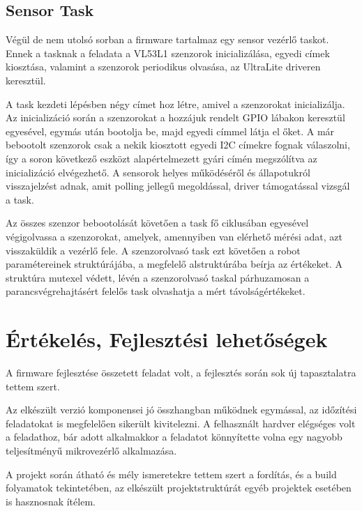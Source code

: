 \subsection{Sensor Task}

Végül de nem utolsó sorban a firmware tartalmaz egy sensor vezérlő taskot. Ennek
a tasknak a feladata a VL53L1 szenzorok inicializálása, egyedi címek kiosztása,
valamint a szenzorok periodikus olvasása, az UltraLite driveren keresztül.

\medskip

A task kezdeti lépésben négy címet hoz létre, amivel a szenzorokat
inicializálja. Az inicializáció során a szenzorokat a hozzájuk rendelt GPIO
lábakon keresztül egyesével, egymás után bootolja be, majd egyedi címmel látja el
őket. A már bebootolt szenzorok csak a nekik kiosztott egyedi I2C címekre fognak
válaszolni, így a soron következő eszközt alapértelmezett gyári címén megszólítva
az inicializáció elvégezhető. A sensorok helyes működéséről és állapotukról
visszajelzést adnak, amit polling jellegű megoldással, driver támogatással
vizsgál a task.

Az összes szenzor bebootolását követően a task fő ciklusában egyesével
végigolvassa a szenzorokat, amelyek, amennyiben van elérhető mérési adat, azt
visszaküldik a vezérlő fele. A szenzorolvasó task ezt követően a robot
paramétereinek struktúrájába, a megfelelő alstruktúrába beírja az értékeket. A
struktúra mutexel védett, lévén a szenzorolvasó taskal párhuzamosan a
parancsvégrehajtásért felelős task olvashatja a mért távolságértékeket. 

\section{Értékelés, Fejlesztési lehetőségek}

A firmware fejlesztése összetett feladat volt, a fejlesztés során sok új
tapasztalatra tettem szert.

\medskip

Az elkészült verzió komponensei jó összhangban működnek egymással, az időzítési
feladatokat is megfelelően sikerült kivitelezni. A felhasznált hardver elégséges
volt a feladathoz, bár adott alkalmakkor a feladatot könnyítette volna egy
nagyobb teljesítményű mikrovezérlő alkalmazása.

A projekt során átható és mély ismeretekre tettem szert a fordítás, és a build
folyamatok tekintetében, az elkészült projektstruktúrát egyéb projektek
esetében is hasznosnak ítélem.  

